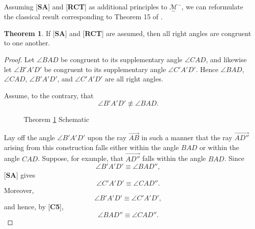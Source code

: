 \documentclass[11pt,a4paper]{article}
\theoremstyle{definition}
\newtheorem{thm}{Theorem}[section]
\theoremstyle{remark}
\numberwithin{equation}{section}
\newcommand{\MG}{\underset{\sim}{\mathcal{M}}} %
\begin{document}
Assuming [\textbf{SA}] and [\textbf{RCT}] as additional principles to $\MG^{-}$, we can reformulate the classical result corresponding to Theorem 15 of \cite{Hilbert1950}.
\begin{thm}\label{PEN_EU4P}
If [\textbf{SA}] and [\textbf{RCT}] are assumed, then all right angles are congruent to one another.
\end{thm}
\begin{proof}
Let $\angle BAD$ be congruent to its supplementary angle $\angle CAD$, and likewise let $\angle B'A'D'$ be congruent to its supplementary angle $\angle C'A'D'$. Hence $\angle BAD$, $\angle CAD$, $\angle B'A'D'$, and $\angle C'A'D'$ are all right angles.

Assume, to the contrary, that
\begin{equation*}
\angle B'A'D'\not\equiv\angle BAD.
\end{equation*}
\begin{figure}[ht!]
\centering
{}
\caption{ Theorem \ref{PEN_EU4P} Schematic}
\label{PEN_f_CP14}
\end{figure}
Lay off the angle $\angle B'A'D'$ upon the ray $\overrightarrow{AB}$ in such a manner that the ray $\overrightarrow{AD''}$ arising from this construction falls either within the angle $BAD$ or within the angle $CAD$. Suppose, for example, that $\overrightarrow{AD''}$ falls within the angle $BAD$. Since
\begin{equation*}
\angle B'A'D'\equiv\angle BAD'',
\end{equation*}
[\textbf{SA}] gives
\begin{equation*}
\angle C'A'D'\equiv\angle CAD''.
\end{equation*}
Moreover,
\begin{equation*}
\angle B'A'D'\equiv\angle C'A'D',
\end{equation*}
and hence, by [\textbf{C5}],
\begin{equation*}
\angle BAD''\equiv\angle CAD''.
\end{equation*}


\end{proof}
\end{document}
